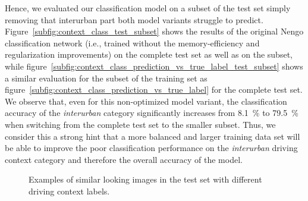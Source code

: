Hence, we evaluated our classification model on a subset of the test set simply removing that interurban part both model variants struggle to predict.
Figure~\ref{subfig:context_class_test_subset} shows the results of the original \ac{Nengo} classification network (i.e., trained without the memory-efficiency and regularization improvements) on the complete test set as well as on the subset, while figure~\ref{subfig:context_class_prediction_vs_true_label_test_subset} shows a similar evaluation for the subset of the training set as figure~\ref{subfig:context_class_prediction_vs_true_label} for the complete test set.
We observe that, even for this non-optimized model variant, the classification accuracy of the \emph{interurban} category significantly increases from \SI{8.1}{\percent} to \SI{79.5}{\percent} when switching from the complete test set to the smaller subset.
Thus, we consider this a strong hint that a more balanced and larger training data set will be able to improve the poor classification performance on the \emph{interurban} driving context category and therefore the overall accuracy of the model.

\begin{figure}[t]
    \centering
    \caption{Examples of similar looking images in the test set with different driving context labels. }
    \label{fig:context_class_similar_image_examples}
\end{figure}

